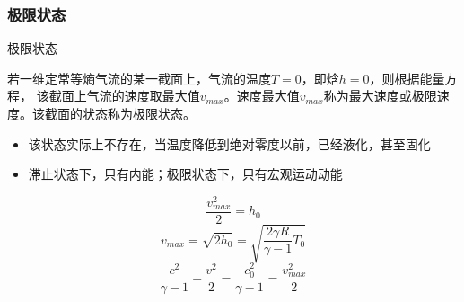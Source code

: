 \subsubsection{极限状态}
\begin{frame}{极限状态}
  \vspace*{-1em}
  \begin{definition}[极限状态]
    若一维定常等熵气流的某一截面上，气流的温度$T=0$，即焓$h=0$，则根据能量方程，
    该截面上气流的速度取最大值$v_{max}$。速度最大值$v_{max}$称为最大速度或极限速
    度。该截面的状态称为极限状态。
 \end{definition} 
 \begin{itemize}
   \item 该状态实际上不存在，当温度降低到绝对零度以前，已经液化，甚至固化
   \item 滞止状态下，只有内能；极限状态下，只有宏观运动动能
 \end{itemize}
    \begin{equation*}
      \frac{v_{max}^{2}}{2}
      =
      h_{0}
    \end{equation*}
    \begin{equation*}
      v_{max}
      =
    \sqrt{2h_{0}}
    =
    \sqrt{\frac{2\gamma R}{\gamma-1}T_{0}}
    \end{equation*}
    \begin{equation*}
      \frac{c^{2}}{\gamma-1}
      +
      \frac{v^{2}}{2}
      =
      \frac{c_{0}^{2}}{\gamma-1}
      =
      \frac{v_{max}^{2}}{2}
    \end{equation*}
\end{frame}

